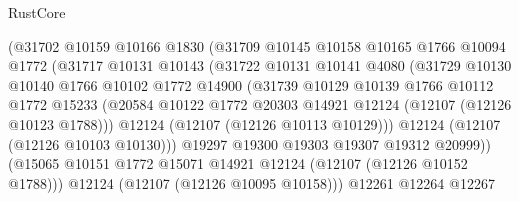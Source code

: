 \begin{lexlean}{RustCore}
\begin{coremodule}
                          (@31702
                            @10159
                            @10166
                            @1830
                            (@31709
                              @10145
                              @10158
                              @10165
                              @1766
                              @10094
                              @1772
                              (@31717
                                @10131
                                @10143
                                (@31722
                                  @10131
                                  @10141
                                  @4080
                                  (@31729
                                    @10130
                                    @10140
                                    @1766
                                    @10102
                                    @1772
                                    @14900
                                    (@31739
                                      @10129
                                      @10139
                                      @1766
                                      @10112
                                      @1772
                                      @15233
                                      (@20584
                                        @10122
                                        @1772
                                        @20303
                                        @14921
                                        @12124
                                        (@12107 (@12126 @10123 @1788)))
                                      @12124
                                      (@12107 (@12126 @10113 @10129)))
                                    @12124
                                    (@12107 (@12126 @10103 @10130)))
                                  @19297
                                  @19300
                                  @19303
                                  @19307
                                  @19312
                                  @20999))
                              (@15065
                                @10151
                                @1772
                                @15071
                                @14921
                                @12124
                                (@12107 (@12126 @10152 @1788)))
                              @12124
                              (@12107 (@12126 @10095 @10158)))
                            @12261
                            @12264
                            @12267

\end{coremodule}
\end{lexlean}
